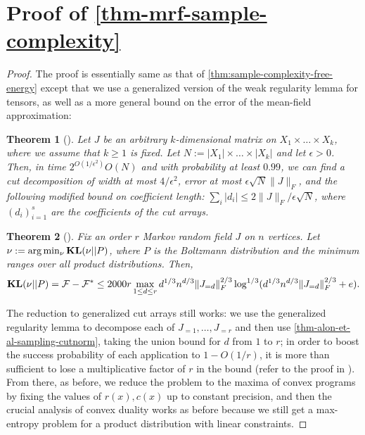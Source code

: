 \documentclass[final, 12pt]{colt2018}
\newcommand{\F}{\mathcal{F}}
\newcommand{\KL}{\mathop{\bf KL\/}}
\newtheorem{theorem}{Theorem}[section]
\theoremstyle{definition}
\theoremstyle{plain}
\begin{document}
\section{Proof of \cref{thm-mrf-sample-complexity}}
\begin{proof}
The proof is essentially same as that of \cref{thm:sample-complexity-free-energy} except that we use a generalized version of the
weak regularity lemma for tensors, as well as a more general bound on the error of the mean-field approximation:
\begin{theorem}[\citet{alon-etal-samplingCSP}\label{reg-alon-etal-mrf}]
Let $J$ be an arbitrary $k$-dimensional matrix on $X_{1}\times\dots\times X_{k}$,
where we assume that $k\geq 1$ is fixed. Let $N:=|X_{1}|\times\dots\times|X_{k}|$
and let $\epsilon>0$. Then, in time $2^{O(1/\epsilon^{2})}O(N)$
and with probability at least $0.99$, we can find a cut decomposition of
width at most $4/\epsilon^{2}$, error at most $\epsilon\sqrt{N}\|J\|_F$,
and the following modified bound on coefficient length: $\sum_i |d_i| \le 2\|J\|_F/\epsilon\sqrt{N}$, where $(d_i)_{i =1}^s$ are the coefficients of
the cut arrays.
\end{theorem}

\begin{theorem}[\citet{previous-paper}]
\label{thm-mrf-main-structural-result} 
Fix an order $r$ Markov random field $J$ on $n$ vertices.
Let $\nu := \arg\min_{\nu} \KL(\nu || P)$, where $P$ is the Boltzmann distribution and the minimum ranges
over all product distributions.
Then, 
$$ \KL(\nu || P)  = \F - \F^{*} \leq 2000r \max_{1 \le d \le r} d^{1/3}n^{d/3} \|J_{=d}\|_F^{2/3} \log^{1/3}(d^{1/3}n^{d/3} \|J_{=d}\|_F^{2/3} + e).$$
\end{theorem}

The reduction to generalized cut arrays still works: we use the generalized
regularity lemma to decompose each of $J_{=1}, \ldots, J_{=r}$ and then use \cref{thm-alon-et-al-sampling-cutnorm}, taking the union bound for $d$ from $1$ to $r$; in order to boost the success probability of each application to $1 - O(1/r)$, it is more than sufficient to lose a multiplicative factor of $r$ in the bound (refer to the proof in \citep{alon-etal-samplingCSP-conference}). %
From there, as before, we reduce the problem to the maxima
of convex programs by fixing the values of $r(x),c(x)$ up to constant precision,
and then the crucial analysis of convex duality works as before because
we still get a max-entropy problem for a product distribution with linear constraints.
\end{proof}
\end{document}
